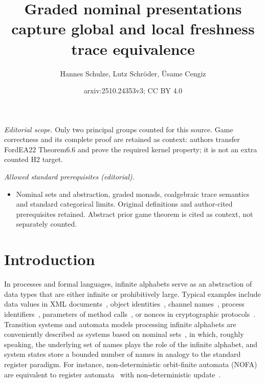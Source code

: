 \documentclass[11pt,a4paper]{amsart}
\title{Graded nominal presentations capture global and local freshness trace equivalence}
\author{Hannes Schulze, Lutz Schröder, Üsame Cengiz}
\date{arxiv:2510.24353v3; CC BY 4.0}
\theoremstyle{plain}
\numberwithin{equation}{section}
\newcommand{\+}[1]{\mathcal{#1}\xspace}
\theoremstyle{definition}
\begin{document}
\maketitle
\noindent\textit{Editorial scope.} Only two principal groups counted for this source. Game correctness and its complete proof are retained as context: authors transfer FordEA22 Theorem6.6 and prove the required kernel property; it is not an extra counted H2 target.\par\medskip
\noindent\textit{Allowed standard prerequisites (editorial).}\begin{itemize}
\item Nominal sets and abstraction, graded monads, coalgebraic trace semantics and standard categorical limits. Original definitions and author-cited prerequisites retained. Abstract prior game theorem is cited as context, not separately counted.
\end{itemize}\medskip
\section{Introduction}\label{sec:intro}

In processes and formal languages, infinite alphabets serve as an
abstraction of data types that are either infinite or prohibitively
large. Typical examples include data values in XML
documents~\cite{NevenEA04}, object identities~\cite{GrigoreEA13},
channel names~\cite{Hennessy02}, process
identifiers~\cite{BolligEA14}, parameters of method
calls~\cite{HowarEA19}, or nonces in cryptographic
protocols~\cite{KurtzEA07}. Transition systems and automata models
processing infinite alphabets are conveniently described as systems
based on nominal sets~\cite{BojanczykEA14,ParrowEA21}, in which,
roughly speaking, the underlying set of names plays the role of the
infinite alphabet, and system states store a bounded number of names
in analogy to the standard register paradigm. For instance,
non-deterministic orbit-finite automata (NOFA)~\cite{BojanczykEA14}
are equivalent to register automata~\cite{KaminskiFrancez94} with
non-deterministic update~\cite{KaminskiZeitlin10}.
\end{document}
